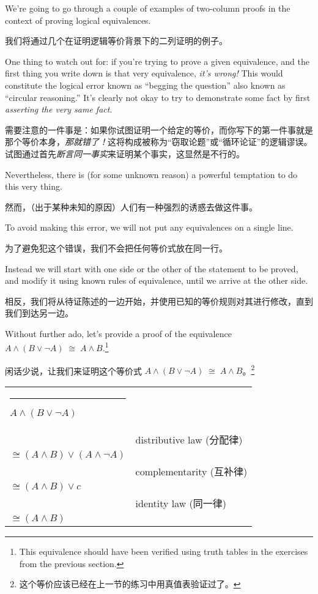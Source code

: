 We're going to go through a couple of examples of two-column proofs 
in the context of proving logical equivalences.

我们将通过几个在证明逻辑等价背景下的二列证明的例子。

One thing to watch out
for: if you're trying to prove a given equivalence, and the first thing 
you write down is that very equivalence, \emph{it's wrong!}  This 
would constitute the logical error known as 
``begging the question'' 
also known as ``circular reasoning.''  
It's clearly not okay to try
to demonstrate some fact by first \emph{asserting the very same fact}.

需要注意的一件事是：如果你试图证明一个给定的等价，而你写下的第一件事就是那个等价本身，\emph{那就错了！}这将构成被称为“窃取论题”或“循环论证”的逻辑谬误。试图通过首先\emph{断言同一事实}来证明某个事实，这显然是不行的。

Nevertheless, there is (for some unknown reason) a powerful temptation
to do this very thing.

然而，（出于某种未知的原因）人们有一种强烈的诱惑去做这件事。

To avoid making this error, we will not
put any equivalences on a single line.

为了避免犯这个错误，我们不会把任何等价式放在同一行。

Instead we will start with 
one side or the other of the statement to be proved, and modify it
using known rules of equivalence, until we arrive at the other side.

相反，我们将从待证陈述的一边开始，并使用已知的等价规则对其进行修改，直到我们到达另一边。

Without further ado, let's provide a proof of the equivalence  
$A \land (B \lor {\lnot}A) \; \cong \; A \land B $.\footnote{This equivalence should have been verified using truth tables in the exercises from the previous
section.}
\medskip

闲话少说，让我们来证明这个等价式 $A \land (B \lor {\lnot}A) \; \cong \; A \land B $。\footnote{这个等价应该已经在上一节的练习中用真值表验证过了。}
\medskip

\begin{center}
\begin{tabular}{p{2in}p{2in}}
\rule{10pt}{0pt} $A \land (B \lor {\lnot}A)$ & \\
 & distributive law (分配律)\\
$\cong (A \land B) \lor (A \land {\lnot}A)$ & \\
 & complementarity (互补律)\\
$\cong (A \land B) \lor c$ & \\
 & identity law (同一律)\\
$\cong (A \land B)$ & \\
\end{tabular}
\end{center}
\medskip

